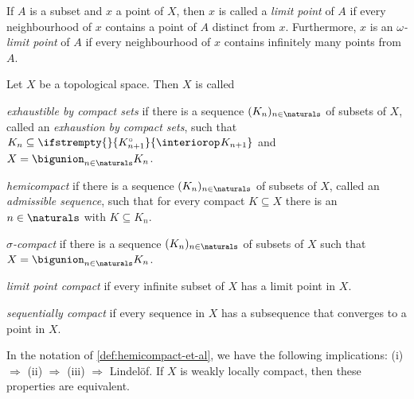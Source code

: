 \documentclass[article, a4paper, 11pt, oneside]{memoir}
\numberwithin{equation}{chapter}
\renewcommand\interior[2][]{%
    \ifstrempty{#1}{%
        #2^{\circ}
    }{%
        \interiorop_{#1}#2
    }%
}
\begin{document}
If $A$ is a subset and $x$ a point of $X$, then $x$ is called a \emph{limit point} of $A$ if every neighbourhood of $x$ contains a point of $A$ distinct from $x$. Furthermore, $x$ is an \emph{$\omega$-limit point} of $A$ if every neighbourhood of $x$ contains infinitely many points from $A$.

\begin{definition}
    \label{def:hemicompact-et-al}
    Let $X$ be a topological space. Then $X$ is called
    \begin{enumdef}
        \item \emph{exhaustible by compact sets} if there is a sequence $(K_n)_{n \in \naturals}$ of subsets of $X$, called an \emph{exhaustion by compact sets}, such that $K_n \subseteq \interior{K_{n+1}}$ and $X = \bigunion_{n \in \naturals} K_n$.
        
        \item \emph{hemicompact} if there is a sequence $(K_n)_{n \in \naturals}$ of subsets of $X$, called an \emph{admissible sequence}, such that for every compact $K \subseteq X$ there is an $n \in \naturals$ with $K \subseteq K_n$.

        \item \emph{$\sigma$-compact} if there is a sequence $(K_n)_{n \in \naturals}$ of subsets of $X$ such that $X = \bigunion_{n \in \naturals} K_n$.

        \item \emph{limit point compact} if every infinite subset of $X$ has a limit point in $X$.

        \item \emph{sequentially compact} if every sequence in $X$ has a subsequence that converges to a point in $X$.
    \end{enumdef}
\end{definition}


\begin{proposition}
    In the notation of \cref{def:hemicompact-et-al}, we have the following implications: (i) $\Rightarrow$ (ii) $\Rightarrow$ (iii) $\Rightarrow$ Lindelöf. If $X$ is weakly locally compact, then these properties are equivalent.
\end{proposition}
\end{document}
